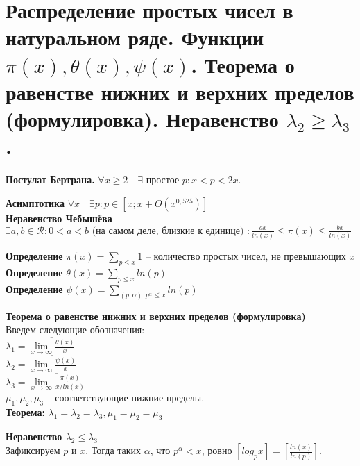 \setcounter{section}{56}
\section{Распределение простых чисел в натуральном ряде. Функции $\pi(x), \theta(x), \psi(x)$. Теорема о равенстве
нижних и верхних пределов (формулировка). Неравенство $\lambda_2 \geq \lambda_3$.}

\textbf{Постулат Бертрана.} $\forall x \geq 2\quad \exists \text{ простое } p: x < p < 2x$.

\textbf{Асимптотика} $\forall x \quad \exists p : p \in [x; x + O(x^{0,525})]$\\

\textbf{Неравенство Чебышёва} $\exists a, b \in \mathcal{R} : 0 < a < b \text{ (на самом деле, близкие к единице) } : \frac{ax}{ln(x)} \leq \pi(x) \leq \frac{bx}{ln(x)}$

\textbf{Определение} $\pi(x) = \displaystyle\sum_{p \leq x}1$ -- количество простых чисел, не превышающих $x$\\

\textbf{Определение} $\theta(x) = \displaystyle\sum_{p \leq x}ln(p)$\\

\textbf{Определение} $\psi(x) = \displaystyle\sum_{(p, \alpha) : p^{\alpha} \leq x}ln(p)$

\textbf{Теорема о равенстве
нижних и верхних пределов (формулировка)}\\

Введем следующие обозначения:\\

$\lambda_1 = \overline{\lim\limits_{x \to \infty} \frac{\theta(x)}{x}}$\\

$\lambda_2 = \overline{\lim\limits_{x \to \infty} \frac{\psi(x)}{x}}$\\

$\lambda_3 = \overline{\lim\limits_{x \to \infty} \frac{\pi(x)}{x/ln(x)}}$\\

$\mu_1, \mu_2, \mu_3$ -- соответствующие нижние пределы.\\

\textbf{Теорема:} $\lambda_1 = \lambda_2 = \lambda_3, \mu_1 = \mu_2 = \mu_3$

\textbf{Неравенство $\lambda_2 \leq \lambda_3$}\\

Зафиксируем $p$ и $x$. Тогда таких $\alpha$, что $p^{\alpha} < x$, ровно $[log_p x] = [\frac{ln(x)}{ln(p)}]$.\\

